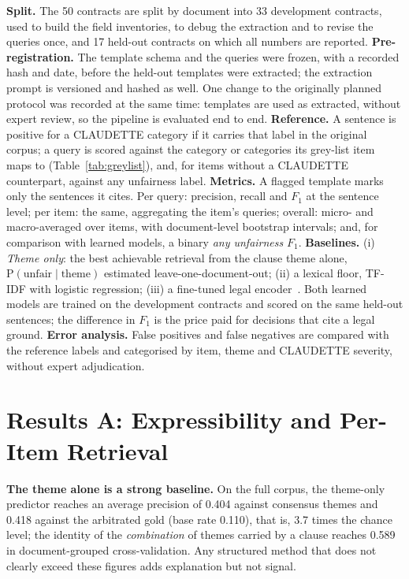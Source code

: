 \documentclass{IOS-Book-Article}
\newcommand{\corpus}{CLAUDETTE}
\begin{document}
\textbf{Split.} The 50 contracts are split by document into 33 development contracts, used to build the field inventories, to debug the extraction and to revise the queries once, and 17 held-out contracts on which all numbers are reported. \textbf{Pre-registration.} The template schema and the queries were frozen, with a recorded hash and date, before the held-out templates were extracted; the extraction prompt is versioned and hashed as well. One change to the originally planned protocol was recorded at the same time: templates are used as extracted, without expert review, so the pipeline is evaluated end to end. \textbf{Reference.} A sentence is positive for a \corpus{} category if it carries that label in the original corpus; a query is scored against the category or categories its grey-list item maps to (Table~\ref{tab:greylist}), and, for items without a \corpus{} counterpart, against any unfairness label. \textbf{Metrics.} A flagged template marks only the sentences it cites. Per query: precision, recall and $F_1$ at the sentence level; per item: the same, aggregating the item's queries; overall: micro- and macro-averaged over items, with document-level bootstrap intervals; and, for comparison with learned models, a binary \emph{any unfairness} $F_1$. \textbf{Baselines.} (i) \emph{Theme only}: the best achievable retrieval from the clause theme alone, $\mathrm{P}(\text{unfair} \mid \text{theme})$ estimated leave-one-document-out; (ii) a lexical floor, TF-IDF with logistic regression; (iii) a fine-tuned legal encoder~\cite{chalkidis2020legalbert}. Both learned models are trained on the development contracts and scored on the same held-out sentences; the difference in $F_1$ is the price paid for decisions that cite a legal ground. \textbf{Error analysis.} False positives and false negatives are compared with the reference labels and categorised by item, theme and \corpus{} severity, without expert adjudication.

\section{Results A: Expressibility and Per-Item Retrieval}
\label{sec:results}
\textbf{The theme alone is a strong baseline.} On the full corpus, the theme-only predictor reaches an average precision of 0.404 against consensus themes and 0.418 against the arbitrated gold (base rate 0.110), that is, 3.7 times the chance level; the identity of the \emph{combination} of themes carried by a clause reaches 0.589 in document-grouped cross-validation. Any structured method that does not clearly exceed these figures adds explanation but not signal.
\end{document}
